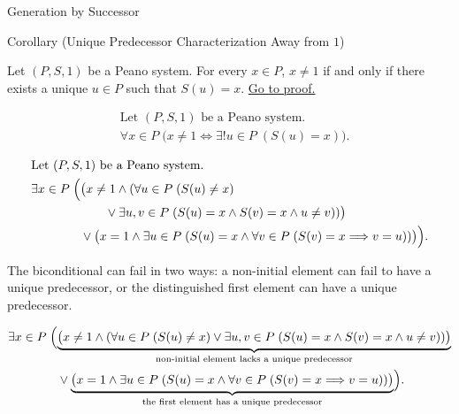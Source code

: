 \begin{topicbox}{Generation by Successor}
\begin{corollarybox}{Corollary (Unique Predecessor Characterization Away from \texorpdfstring{$1$}{1})}
\begin{corollary}
\label{cor:unique-predecessor-characterization-away-from-one}
Let $(P,S,1)$ be a Peano system. For every $x \in P$, $x \neq 1$ if and
only if there exists a unique $u \in P$ such that $S(u)=x$.
\hyperref[prf:unique-predecessor-characterization-away-from-one]{Go to proof.}
\end{corollary}
\end{corollarybox}

\begin{remark*}
\[
\begin{aligned}
&\text{Let } (P,S,1) \text{ be a Peano system.}\\
&\forall x \in P\;\bigl(x\neq 1 \Longleftrightarrow
\exists! u \in P\;(S(u)=x)\bigr).
\end{aligned}
\]
\end{remark*}

\begin{remark*}
\[
\begin{aligned}
&\text{Let } (P,S,1) \text{ be a Peano system.}\\
&\exists x \in P\;\Bigl(
\bigl(x\neq 1 \land
(\forall u \in P\;(S(u)\neq x)\\
&\qquad\qquad\qquad\lor
\exists u,v \in P\;(S(u)=x \land S(v)=x \land u\neq v))\bigr)\\
&\qquad\qquad\lor
\bigl(x=1 \land \exists u \in P\;(S(u)=x \land
\forall v \in P\;(S(v)=x \Longrightarrow v=u))\bigr)
\Bigr).
\end{aligned}
\]
\end{remark*}

\begin{remark*}
The biconditional can fail in two ways: a non-initial element can fail to have
a unique predecessor, or the distinguished first element can have a unique
predecessor.
\end{remark*}

\begin{remark*}
\[
\begin{aligned}
&\exists x \in P\;\Bigl(
\underbrace{\bigl(x\neq 1 \land
(\forall u \in P\;(S(u)\neq x)
\lor
\exists u,v \in P\;(S(u)=x \land S(v)=x \land u\neq v))\bigr)}_
{\text{non-initial element lacks a unique predecessor}}\\
&\qquad\qquad\lor
\underbrace{\bigl(x=1 \land \exists u \in P\;(S(u)=x \land
\forall v \in P\;(S(v)=x \Longrightarrow v=u))\bigr)}_
{\text{the first element has a unique predecessor}}
\Bigr).
\end{aligned}
\]
\end{remark*}


\end{topicbox}
